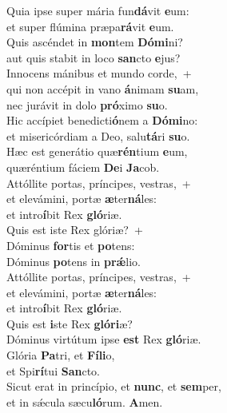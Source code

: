 \evenverse Quia ipse super mária fun\textbf{dá}vit \textbf{e}um:~\*\\
\evenverse et super flúmina præpa\textbf{rá}vit \textbf{e}um.\\
\oddverse Quis ascéndet in \textbf{mon}tem \textbf{Dó}\textbf{mi}ni?~\*\\
\oddverse aut quis stabit in loco \textbf{san}cto \textbf{e}jus?\\
\evenverse Innocens mánibus et mundo corde,~+\\
\evenverse  qui non accépit in vano \textbf{á}nimam \textbf{su}am,~\*\\
\evenverse nec jurávit in dolo \textbf{pró}ximo \textbf{su}o.\\
\oddverse Hic accípiet benedicti\textbf{ó}nem a \textbf{Dó}\textbf{mi}no:~\*\\
\oddverse et misericórdiam a Deo, salu\textbf{tá}ri \textbf{su}o.\\
\evenverse Hæc est generátio quæ\textbf{rén}tium \textbf{e}um,~\*\\
\evenverse quæréntium fáciem \textbf{De}i \textbf{Ja}cob.\\
\oddverse Attóllite portas, príncipes, vestras,~+\\
\oddverse  et elevámini, portæ \textbf{æ}ter\textbf{ná}les:~\*\\
\oddverse et intro\textbf{í}bit Rex \textbf{gló}riæ.\\
\evenverse Quis est iste Rex glóriæ?~+\\
\evenverse  Dóminus \textbf{for}tis et \textbf{po}tens:~\*\\
\evenverse Dóminus \textbf{po}tens in \textbf{prǽ}lio.\\
\oddverse Attóllite portas, príncipes, vestras,~+\\
\oddverse  et elevámini, portæ \textbf{æ}ter\textbf{ná}les:~\*\\
\oddverse et intro\textbf{í}bit Rex \textbf{gló}riæ.\\
\evenverse Quis est \textbf{i}ste Rex \textbf{gló}\textbf{ri}æ?~\*\\
\evenverse Dóminus virtútum ipse \textbf{est} Rex \textbf{gló}riæ.\\
\oddverse Glória \textbf{Pa}tri, et \textbf{Fí}\textbf{li}o,~\*\\
\oddverse et Spi\textbf{rí}tui \textbf{San}cto.\\
\evenverse Sicut erat in princípio, et \textbf{nunc}, et \textbf{sem}per,~\*\\
\evenverse et in sǽcula sæcu\textbf{ló}rum. \textbf{A}men.\\
